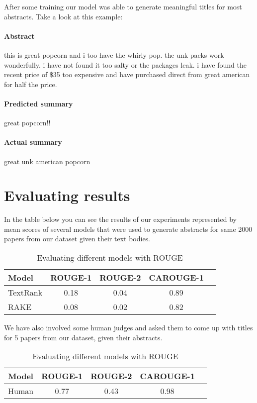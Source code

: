\documentclass[sigplan]{acmart}
\begin{document}
After some training our model was able to generate meaningful titles for most abstracts. Take a look at this example:

\paragraph{Abstract} this is great popcorn and i too have the whirly pop. the unk packs work wonderfully. i have not found it too salty or the packages leak. i have found the recent price of \$35 too expensive and have purchased direct from great american for half the price.

\paragraph{Predicted summary} great popcorn!!

\paragraph{Actual summary} great unk american popcorn


\section{Evaluating results}

In the table below you can see the results of our experiments represented by mean scores of several models that were used to generate abstracts for same 2000 papers from our dataset given their text bodies.

\begin{table}[H]
\caption{Evaluating different models with ROUGE}

\begin{center}
\begin{tabular}{|l|c|c|c|c|}
\hline
\textbf{Model} & \textbf{ROUGE-1} & \textbf{ROUGE-2} & \textbf{CAROUGE-1} \\
\hline
TextRank & 0.18 & 0.04 & 0.89 \\
RAKE & 0.08 & 0.02 & 0.82 \\
\hline
\end{tabular}
\end{center}
\end{table}

We have also involved some human judges and asked them to come up with titles for 5 papers from our dataset, given their abstracts.

\begin{table}[H]
\caption{Evaluating different models with ROUGE}

\begin{center}
\begin{tabular}{|l|c|c|c|c|}
\hline
\textbf{Model} & \textbf{ROUGE-1} & \textbf{ROUGE-2} & \textbf{CAROUGE-1} \\
\hline
Human & 0.77 & 0.43 & 0.98 \\
\hline
\end{tabular}
\end{center}
\end{table}
\end{document}
